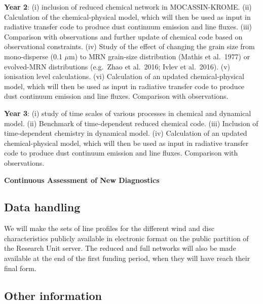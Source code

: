 \documentclass[10pt,fleqn,twoside]{article}
\begin{document}
{\Tcol\bf Year 2}: (i) inclusion of reduced chemical network in MOCASSIN-KROME. (ii) Calculation of the chemical-physical model, which will then be used as input in radiative transfer code to produce dust continuum emission and line fluxes. (iii) Comparison with observations and further update of chemical code based on observational constraints. (iv) Study of the effect of changing the grain size from mono-disperse (0.1 $\mu$m) to MRN grain-size distribution (Mathis et al.\ 1977) or evolved-MRN distributions (e.g.\ Zhao et al.\ 2016; Ivlev et al.\ 2016). (v) ionisation level calculations. (vi)  Calculation of an updated chemical-physical model, which will then be used as input in radiative transfer code to produce dust continuum emission and line fluxes. Comparison with observations.

{\Tcol\bf Year 3}: (i) study of time scales of various processes in chemical and dynamical model. (ii) Benchmark of time-dependent reduced chemical code. (iii) Inclusion of time-dependent chemistry in dynamical model. (iv)  Calculation of an updated chemical-physical model, which will then be used as input in radiative transfer code to produce dust continuum emission and line fluxes. Comparison with observations.

{\Tcol\bf Continuous Assessment of New Diagnostics} 


\subsection{Data handling}
We will make the sets of line profiles for the different wind and disc characteristics publicly available in electronic format on the public partition of the Research Unit server. The reduced and full networks will also be made available at the end of the first funding period, when they will have reach their final form. 

\subsection{Other information}
\end{document}
